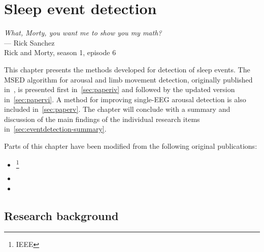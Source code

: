 \chapter{Sleep event detection}\label{chap:sleep-event-detection}
\begin{flushright}{\slshape 
        What, Morty, you want me to show you my math?} \\ \medskip
        --- Rick Sanchez\\Rick and Morty, season 1, episode 6
\end{flushright}
\vspace{6cm}

This chapter presents the methods developed for detection of sleep events.
The \ac{MSED} algorithm for arousal and limb movement detection, originally published in~\cite{Olesen2019}, is presented first in~\cref{sec:paperiv} and followed by the updated version in~\cref{sec:papervi}. 
A method for improving single-\ac{EEG} arousal detection is also included in~\cref{sec:paperv}. 
The chapter will conclude with a summary and discussion of the main findings of the individual research items in~\cref{sec:eventdetection-summary}.

Parts of this chapter have been modified from the following original publications:
\begin{itemize}
    \item {}\footnote{ IEEE}
    \item {}
    \item {}
\end{itemize}


\section{Research background}

